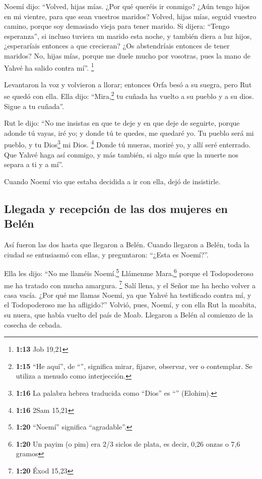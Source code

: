  Noemí dijo: ``Volved, hijas mías. ¿Por qué queréis ir
conmigo? ¿Aún tengo hijos en mi vientre, para que sean vuestros maridos?
 Volved, hijas mías, seguid vuestro camino, porque soy
demasiado vieja para tener marido. Si dijera: ``Tengo esperanza'', si
incluso tuviera un marido esta noche, y también diera a luz hijos,
 ¿esperaríais entonces a que crecieran? ¿Os abstendríais
entonces de tener maridos? No, hijas mías, porque me duele mucho por
vosotras, pues la mano de Yahvé ha salido contra mí''. \footnote{\textbf{1:13}
  Job 19,21}

 Levantaron la voz y volvieron a llorar; entonces Orfa
besó a su suegra, pero Rut se quedó con ella.  Ella dijo:
``Mira,\footnote{\textbf{1:15} ``He aquí'', de ``'',
  significa mirar, fijarse, observar, ver o contemplar. Se utiliza a
  menudo como interjección.} tu cuñada ha vuelto a su pueblo y a su
dios. Sigue a tu cuñada''.

 Rut le dijo: ``No me insistas en que te deje y en que
deje de seguirte, porque adonde tú vayas, iré yo; y donde tú te quedes,
me quedaré yo. Tu pueblo será mi pueblo, y tu Dios\footnote{\textbf{1:16}
  La palabra hebrea traducida como ``Dios'' es ``''
  (Elohim).} mi Dios. \footnote{\textbf{1:16} 2Sam 15,21}
 Donde tú mueras, moriré yo, y allí seré enterrado. Que
Yahvé haga así conmigo, y más también, si algo más que la muerte nos
separa a ti y a mí''.

 Cuando Noemí vio que estaba decidida a ir con ella, dejó
de insistirle.

\hypertarget{llegada-y-recepciuxf3n-de-las-dos-mujeres-en-beluxe9n}{%
\subsection{Llegada y recepción de las dos mujeres en
Belén}\label{llegada-y-recepciuxf3n-de-las-dos-mujeres-en-beluxe9n}}

 Así fueron las dos hasta que llegaron a Belén. Cuando
llegaron a Belén, toda la ciudad se entusiasmó con ellas, y preguntaron:
``¿Esta es Noemí?''.

 Ella les dijo: ``No me llaméis Noemí.\footnote{\textbf{1:20}
  ``Noemí'' significa ``agradable''.} Llámenme Mara,\footnote{\textbf{1:20}
  Un payim (o pim) era 2/3 siclos de plata, es decir, 0,26 onzas o 7,6
  gramos} porque el Todopoderoso me ha tratado con mucha amargura.
\footnote{\textbf{1:20} Éxod 15,23}  Salí llena, y el
Señor me ha hecho volver a casa vacía. ¿Por qué me llamas Noemí, ya que
Yahvé ha testificado contra mí, y el Todopoderoso me ha afligido?''
 Volvió, pues, Noemí, y con ella Rut la moabita, su
nuera, que había vuelto del país de Moab. Llegaron a Belén al comienzo
de la cosecha de cebada.

